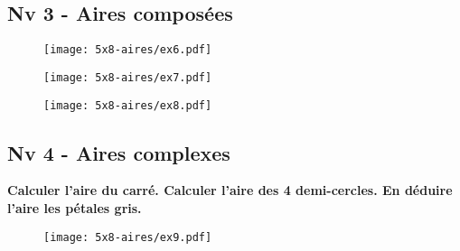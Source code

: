 \Pointilles[20]

\newpage

\subsection*{Nv 3 - Aires composées}

\begin{multicols}{3}

\begin{figure}[H]
  \centering
  \texttt{[image: 5x8-aires/ex6.pdf]}
\end{figure}

\begin{figure}[H]
  \centering
  \texttt{[image: 5x8-aires/ex7.pdf]}
\end{figure}

\begin{figure}[H]
  \centering
  \texttt{[image: 5x8-aires/ex8.pdf]}
\end{figure}

\end{multicols}

\Pointilles[20]

\subsection*{Nv 4 - Aires complexes}

\textbf{Calculer l'aire du carré. Calculer l'aire des 4 demi-cercles. En déduire l'aire les pétales gris.}

\begin{minipage}[t]{0.25\textwidth}
\begin{figure}[H]
  \centering
  \texttt{[image: 5x8-aires/ex9.pdf]}
\end{figure}
\end{minipage}
\begin{minipage}[t]{0.75\textwidth}
  \Pointilles[10]
\end{minipage}

